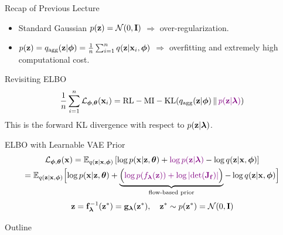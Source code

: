 \documentclass{beamer}
\begin{document}
\begin{frame}{Recap of Previous Lecture}
	\begin{itemize}
		\item Standard Gaussian $p(\mathbf{z}) = \mathcal{N}(0, \mathbf{I})$ $\Rightarrow$ over-regularization.
		\item $p(\mathbf{z}) = q_{\text{agg}}(\mathbf{z} | \boldsymbol{\phi}) = \frac{1}{n}\sum_{i=1}^n q(\mathbf{z} | \mathbf{x}_i, \boldsymbol{\phi})$ $\Rightarrow$ overfitting and extremely high computational cost.
	\end{itemize}
	\begin{block}{Revisiting ELBO}
		\vspace{-0.4cm}
		\[
		\frac{1}{n}\sum_{i=1}^n \mathcal{L}_{\boldsymbol{\phi}, \boldsymbol{\theta}}(\mathbf{x}_i) = \text{RL} - \text{MI} -  \mathrm{KL}(q_{\text{agg}}(\mathbf{z} | \boldsymbol{\phi}) \,\|\, {\color{violet}p(\mathbf{z} | \boldsymbol{\lambda})})
		\]
		This is the forward KL divergence with respect to $p(\mathbf{z} | \boldsymbol{\lambda})$.
	\end{block}
	\begin{block}{ELBO with Learnable VAE Prior}
		\vspace{-0.6cm}
		{\small
			\begin{multline*}
				\mathcal{L}_{\boldsymbol{\phi}, \boldsymbol{\theta}}(\mathbf{x}) = \mathbb{E}_{q(\mathbf{z} | \mathbf{x}, \boldsymbol{\phi})} \left[ \log p(\mathbf{x} | \mathbf{z}, \boldsymbol{\theta}) + {\color{violet}\log p(\mathbf{z} | \boldsymbol{\lambda})} - \log q(\mathbf{z} | \mathbf{x}, \boldsymbol{\phi}) \right] \\
				= \mathbb{E}_{q(\mathbf{z} | \mathbf{x}, \boldsymbol{\phi})} \Bigl[ \log p(\mathbf{x} | \mathbf{z}, \boldsymbol{\theta}) + \underbrace{ \Bigl({\color{violet} \log p(f_{\boldsymbol{\lambda}}(\mathbf{z})) + \log \left| \det (\mathbf{J}_{\mathbf{f}}) \right|} \Bigr) }_{\text{flow-based prior}} - \log q(\mathbf{z} | \mathbf{x}, \boldsymbol{\phi}) \Bigr] 
			\end{multline*}
		}
		\vspace{-0.5cm}
		\[
			\mathbf{z} = \mathbf{f}^{-1}_{\boldsymbol{\lambda}}(\mathbf{z}^*) = \mathbf{g}_{\boldsymbol{\lambda}}(\mathbf{z}^*), \quad \mathbf{z}^* \sim p(\mathbf{z}^*) = \mathcal{N}(0, \mathbf{I})
		\]
	\end{block}
	\vspace{-0.5cm}
\end{frame}
\begin{frame}{Outline}
	\tableofcontents
\end{frame}
\end{document}

